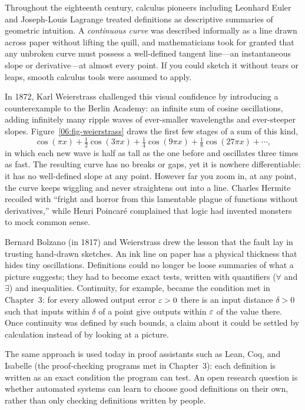 \begin{historybox}
Throughout the eighteenth century, calculus pioneers including Leonhard Euler and Joseph-Louis Lagrange treated definitions as descriptive summaries of geometric intuition. A \emph{continuous curve} was described informally as a line drawn across paper without lifting the quill, and mathematicians took for granted that any unbroken curve must possess a well-defined tangent line---an instantaneous slope or derivative---at almost every point. If you could sketch it without tears or leaps, smooth calculus tools were assumed to apply.

In 1872, Karl Weierstrass challenged this visual confidence by introducing a counterexample to the Berlin Academy: an infinite sum of cosine oscillations, adding infinitely many ripple waves of ever-smaller wavelengths and ever-steeper slopes. Figure~\ref{06:fig-weierstrass} draws the first few stages of a sum of this kind,
\[
\cos(\pi x) + \tfrac{1}{2}\cos(3\pi x) + \tfrac{1}{4}\cos(9\pi x) + \tfrac{1}{8}\cos(27\pi x) + \cdots,
\]
in which each new wave is half as tall as the one before and oscillates three times as fast. The resulting curve has no breaks or gaps, yet it is nowhere differentiable: it has no well-defined slope at any point. However far you zoom in, at any point, the curve keeps wiggling and never straightens out into a line. Charles Hermite recoiled with ``fright and horror from this lamentable plague of functions without derivatives,'' while Henri Poincar\'e complained that logic had invented monsters to mock common sense.

Bernard Bolzano (in 1817) and Weierstrass drew the lesson that the fault lay in trusting hand-drawn sketches. An ink line on paper has a physical thickness that hides tiny oscillations. Definitions could no longer be loose summaries of what a picture suggests; they had to become exact tests, written with quantifiers ($\forall$ and $\exists$) and inequalities. Continuity, for example, became the condition met in Chapter~3: for every allowed output error $\varepsilon > 0$ there is an input distance $\delta > 0$ such that inputs within $\delta$ of a point give outputs within $\varepsilon$ of the value there. Once continuity was defined by such bounds, a claim about it could be settled by calculation instead of by looking at a picture.

The same approach is used today in proof assistants such as Lean, Coq, and Isabelle (the proof-checking programs met in Chapter~3): each definition is written as an exact condition the program can test. An open research question is whether automated systems can learn to choose good definitions on their own, rather than only checking definitions written by people.
\end{historybox}

